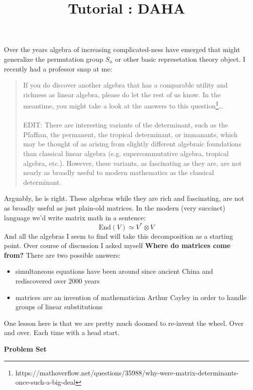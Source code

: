\documentclass[12pt]{article}
\title{Tutorial : DAHA}
\date{}
\begin{document}
\selectfont \fontsize{12.5}{15}\selectfont

\maketitle

\noindent Over the years algebra of increasing complicated-ness have emerged that might generalize the permutation group $S_n$ or other basic represetation theory object.   I recently had a professor snap at me:
\begin{quotation}
If you do discover another algebra that has a comparable utility and richness as linear algebra, please do let the rest of us know. In the meantime, you might take a look at the answers to this question\footnote{https://mathoverflow.net/questions/35988/why-were-matrix-determinants-once-such-a-big-deal}\dots \\ \\
EDIT: There are interesting variants of the determinant, such as the Pfaffian, the permanent, the tropical determinant, or immanants, which may be thought of as arising from slightly different algebraic foundations than classical linear algebra (e.g. supercommutative algebra, tropical algebra, etc.). However, these variants, as fascinating as they are, are not nearly as broadly useful to modern mathematics as the classical determinant.
\end{quotation} 
Arguably, he is right.  These algebras while they are rich and fascinating, are not as broadly useful as just plain-old matrices.  In the modern (very succinct) language we'd write matrix math in a sentence:
$$ \text{End}(V) \simeq V^* \otimes V $$
And all the algebras I seem to find will take this decomposition as a starting point.  Over course of discussion I asked myself \textbf{Where do matrices come from?}  There are two possible answers:
\begin{itemize}
\item simultaneous equations have been around since ancient China and rediscovered over 2000 years
\item matrices are an invention of mathematician Arthur Cayley in order to handle groups of linear substitutions
\end{itemize}
One lesson here is that we are pretty much doomed to re-invent the wheel.  Over and over.  Each time with a head start.  

\newpage \noindent \textbf{Problem Set}
\end{document}
